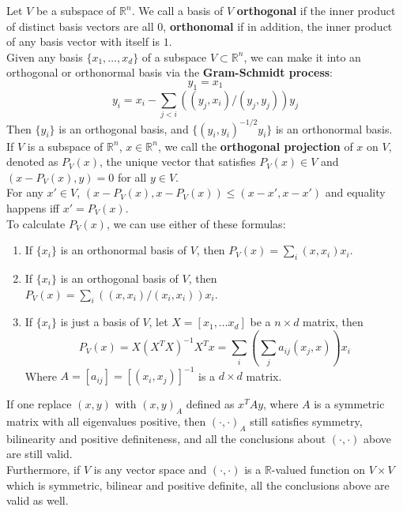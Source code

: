 \documentclass{article} %
\theoremstyle{break}
\begin{document}
Let $V$ be a subspace of $\mathbb{R}^n$. We call a basis of $V$ {\bf orthogonal} if the inner product of distinct basis vectors are all $0$, {\bf orthonomal} if in addition, the inner product of any basis vector with itself is $1$.\\

Given any basis $\{x_1, \dots, x_d\}$ of a subspace $V\subset \mathbb{R}^n$, we can make it into an orthogonal or orthonormal basis via the {\bf Gram-Schmidt process}:
\[y_1=x_1\]
\[y_i=x_i-\sum_{j<i}((y_j, x_i)/(y_j, y_j))y_j\]
Then $\{y_i\}$ is an orthogonal basis, and $\{(y_i, y_i)^{-1/2}y_i\}$ is an orthonormal basis.\\

If $V$ is a subspace of $\mathbb{R}^n$, $x\in \mathbb{R}^n$, we call the {\bf orthogonal projection} of $x$ on $V$, denoted as $P_V(x)$, the unique vector that satisfies $P_V(x)\in V$ and $(x-P_V(x), y)=0$ for all $y\in V$.\\

For any $x'\in V$, $(x-P_V(x), x-P_V(x))\leq (x-x', x-x')$ and equality happens iff $x'=P_V(x)$.\\

To calculate $P_V(x)$, we can use either of these formulas:

\begin{enumerate}
\item If $\{x_i\}$ is an orthonormal basis of $V$, then $P_V(x)=\sum_i(x, x_i)x_i$.
\item If $\{x_i\}$ is an orthogonal basis of $V$, then $P_V(x)=\sum_i((x, x_i)/(x_i, x_i))x_i$.
\item If $\{x_i\}$ is just a basis of $V$, let $X=[x_1, \dots x_d]$ be a $n\times d$ matrix, then
  \[P_V(x)=X(X^TX)^{-1}X^Tx=\sum_i(\sum_j a_{ij}(x_j, x)) x_i\]
  Where $A=[a_{ij}]=[(x_i, x_j)]^{-1}$ is a $d\times d$ matrix. 
\end{enumerate}

If one replace $(x, y)$ with $(x, y)_A$ defined as $x^TAy$, where $A$ is a symmetric matrix with all eigenvalues positive, then $(\cdot, \cdot)_A$ still satisfies symmetry, bilinearity and positive definiteness, and all the conclusions about $(\cdot, \cdot)$ above are still valid.\\

Furthermore, if $V$ is any vector space and $(\cdot, \cdot)$ is a $\mathbb{R}$-valued function on $V\times V$ which is symmetric, bilinear and positive definite, all the conclusions above are valid as well.
\end{document}
